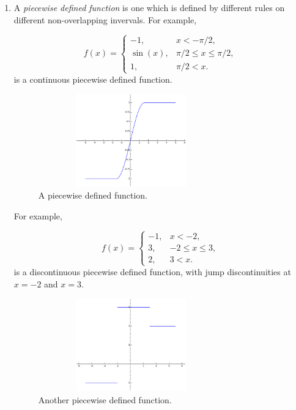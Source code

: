 \begin{enumerate}
\item
A {\it piecewise defined function}
is one which is defined by different rules on 
different non-overlapping invervals. For example,

\[
f(x) = 
\left\{
\begin{array}{ll}
-1, & x<-\pi/2,\\
\sin(x), &\pi/2\leq x\leq \pi/2,\\
1, &\pi/2<x.
\end{array}
\right.
\]
is a continuous piecewise defined function.

\begin{figure}[h!]
\begin{center}
\includegraphics[height=4cm,width=8cm]{piecewise.eps}
\end{center}
\caption{A piecewise defined function.}
\label{fig:piecewise}
\end{figure}

For example,

\[
f(x) = 
\left\{
\begin{array}{ll}
-1, & x<-2,\\
3, &-2\leq x\leq 3,\\
2, &3<x.
\end{array}
\right.
\]
is a discontinuous piecewise defined function, with 
jump discontinuities at $x=-2$ and $x=3$.

\begin{figure}[h!]
\begin{center}
\includegraphics[height=4cm,width=8cm]{piecewise2.eps}
\end{center}
\caption{Another piecewise defined function.}
\label{fig:piecewise2}
\end{figure}

\end{enumerate}

